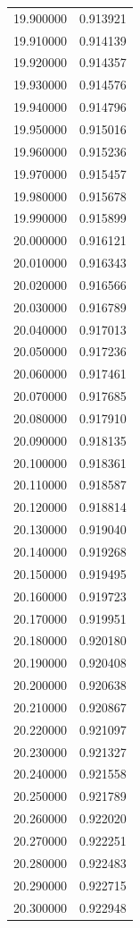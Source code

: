 \begin{tabular}{rr}
19.900000 & 0.913921 \\
19.910000 & 0.914139 \\
19.920000 & 0.914357 \\
19.930000 & 0.914576 \\
19.940000 & 0.914796 \\
19.950000 & 0.915016 \\
19.960000 & 0.915236 \\
19.970000 & 0.915457 \\
19.980000 & 0.915678 \\
19.990000 & 0.915899 \\
20.000000 & 0.916121 \\
20.010000 & 0.916343 \\
20.020000 & 0.916566 \\
20.030000 & 0.916789 \\
20.040000 & 0.917013 \\
20.050000 & 0.917236 \\
20.060000 & 0.917461 \\
20.070000 & 0.917685 \\
20.080000 & 0.917910 \\
20.090000 & 0.918135 \\
20.100000 & 0.918361 \\
20.110000 & 0.918587 \\
20.120000 & 0.918814 \\
20.130000 & 0.919040 \\
20.140000 & 0.919268 \\
20.150000 & 0.919495 \\
20.160000 & 0.919723 \\
20.170000 & 0.919951 \\
20.180000 & 0.920180 \\
20.190000 & 0.920408 \\
20.200000 & 0.920638 \\
20.210000 & 0.920867 \\
20.220000 & 0.921097 \\
20.230000 & 0.921327 \\
20.240000 & 0.921558 \\
20.250000 & 0.921789 \\
20.260000 & 0.922020 \\
20.270000 & 0.922251 \\
20.280000 & 0.922483 \\
20.290000 & 0.922715 \\
20.300000 & 0.922948 \\

\end{tabular}
